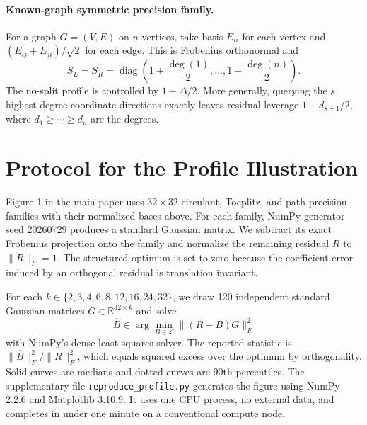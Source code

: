 \documentclass[twoside]{article}
\newcommand{\cL}{\mathcal L}
\begin{document}
\paragraph{Known-graph symmetric precision family.}
For a graph $G=(V,E)$ on $n$ vertices, take basis $E_{ii}$ for each vertex
and $(E_{ij}+E_{ji})/\sqrt2$ for each edge. This is Frobenius orthonormal and
\[
 S_L=S_R=\operatorname{diag}
 \left(1+\frac{\deg(1)}2,\ldots,1+\frac{\deg(n)}2\right).
\]
The no-split profile is controlled by $1+\Delta/2$. More generally, querying
the $s$ highest-degree coordinate directions exactly leaves residual leverage
$1+d_{s+1}/2$, where $d_1\ge\cdots\ge d_n$ are the degrees.

\section{Protocol for the Profile Illustration}
\label{app:experiment}

Figure 1 in the main paper uses $32\times32$ circulant, Toeplitz, and path
precision families with their normalized bases above. For each family, NumPy
generator seed 20260729 produces a standard Gaussian matrix. We subtract its
exact Frobenius projection onto the family and normalize the remaining
residual $R$ to $\|R\|_F=1$. The structured optimum is set to zero because the
coefficient error induced by an orthogonal residual is translation invariant.

For each $k\in\{2,3,4,6,8,12,16,24,32\}$, we draw 120 independent standard
Gaussian matrices $G\in\mathbb R^{32\times k}$ and solve
\[
 \widehat B\in\arg\min_{B\in\cL}\|(R-B)G\|_F^2
\]
with NumPy's dense least-squares solver. The reported statistic is
$\|\widehat B\|_F^2/\|R\|_F^2$, which equals squared excess over the optimum
by orthogonality. Solid curves are medians and dotted curves are 90th
percentiles. The supplementary file \texttt{reproduce\_profile.py} generates
the figure using NumPy 2.2.6 and Matplotlib 3.10.9. It uses one CPU process,
no external data, and completes in under one minute on a conventional compute
node.


\end{document}
